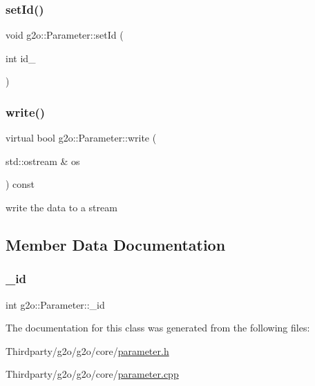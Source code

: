 \mbox{\label{classg2o_1_1_parameter_a2872398ab7d8c95d0a1b5ca5bbfae461}} 
\subsubsection{\texorpdfstring{set\+Id()}{setId()}}
{\footnotesize\ttfamily void g2o\+::\+Parameter\+::set\+Id (\begin{DoxyParamCaption}\item[{int}]{id\+\_\+ }\end{DoxyParamCaption})}

\mbox{\label{classg2o_1_1_parameter_a18e66a40cd71a4da2ab9be5ba318abb7}} 
\subsubsection{\texorpdfstring{write()}{write()}}
{\footnotesize\ttfamily virtual bool g2o\+::\+Parameter\+::write (\begin{DoxyParamCaption}\item[{std\+::ostream \&}]{os }\end{DoxyParamCaption}) const\hspace{0.3cm}{\ttfamily [pure virtual]}}



write the data to a stream 



\subsection{Member Data Documentation}
\mbox{\label{classg2o_1_1_parameter_a602d08079c6a3a5f868e41a102e1db0b}} 
\subsubsection{\texorpdfstring{\+\_\+id}{\_id}}
{\footnotesize\ttfamily int g2o\+::\+Parameter\+::\+\_\+id\hspace{0.3cm}{\ttfamily [protected]}}



The documentation for this class was generated from the following files\+:\begin{DoxyCompactItemize}
\item 
Thirdparty/g2o/g2o/core/\mbox{\hyperlink{parameter_8h}{parameter.\+h}}\item 
Thirdparty/g2o/g2o/core/\mbox{\hyperlink{parameter_8cpp}{parameter.\+cpp}}\end{DoxyCompactItemize}
